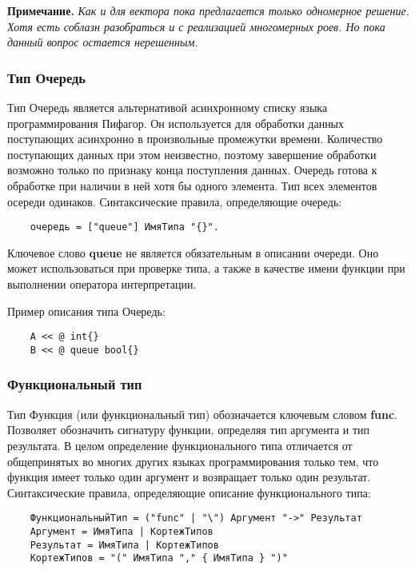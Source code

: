 {\textbf{Примечание.}
\textit{Как и для вектора пока предлагается только одномерное решение. Хотя есть соблазн разобраться и с реализацией многомерных роев. Но пока данный вопрос остается нерешенным.}

\subsubsection{Тип Очередь}

Тип Очередь является альтернативой асинхронному списку языка программирования Пифагор. Он используется для обработки данных поступающих асинхронно в произвольные промежутки времени. Количество поступающих данных при этом неизвестно, поэтому завершение обработки возможно только по признаку конца поступления данных. Очередь готова к обработке при наличии в ней хотя бы одного элемента. Тип всех элементов осереди одинаков. Синтаксические правила, определяющие очередь:

\begin{verbatim}
    очередь = ["queue"] ИмяТипа "{}".
\end{verbatim}

Ключевое слово \textbf{queue} не является обязательным в описании очереди. Оно может использоваться при проверке типа, а также в качестве имени функции при выполнении оператора интерпретации.

Пример описания типа Очередь:

\begin{verbatim}
    A << @ int{}
    B << @ queue bool{}
\end{verbatim}

\subsubsection{Функциональный тип}

Тип Функция (или функциональный тип) обозначается ключевым словом \textbf{func}. Позволяет обозначить сигнатуру функции, определяя тип аргумента и тип результата. В целом определение функционального типа отличается от общепринятых во многих других языках программирования только тем, что функция имеет только один аргумент и возвращает только один результат. Синтаксические правила, определяющие описание функционального типа:

\begin{verbatim}
    ФункциональныйТип = ("func" | "\") Аргумент "->" Результат
    Аргумент = ИмяТипа | КортежТипов
    Результат = ИмяТипа | КортежТипов
    КортежТипов = "(" ИмяТипа "," { ИмяТипа } ")"
\end{verbatim}

}

